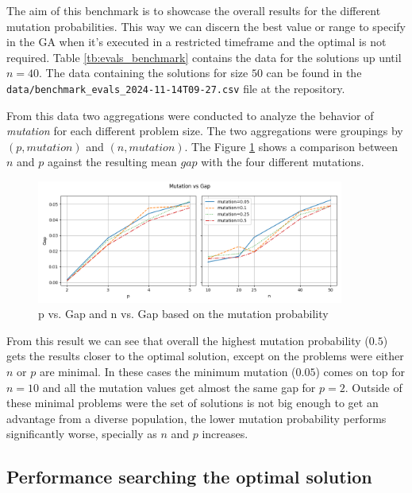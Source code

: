 \documentclass[onecolumn]{IEEEtran}
\def\code#1{\texttt{#1}}
\begin{document}
The aim of this benchmark is to showcase the overall results for the different mutation probabilities.
This way we can discern the best value or range to specify in the GA when it's executed in a restricted
timeframe and the optimal is not required.  Table \ref{tb:evals_benchmark}
contains the data for the solutions up until $n=40$. The data containing the solutions for size $50$
can be found in the \code{data/benchmark\_evals\_2024-11-14T09-27.csv} file at the repository\cite{SotoEstevezGA2024}.



From this data two aggregations were conducted to analyze the behavior of \emph{mutation} for each
different problem size. The two aggregations were groupings by $(p,mutation)$ and $(n,mutation)$.
The Figure \ref{fig:mutation_vs_gap}
shows a comparison between $n$ and $p$ against the resulting mean $gap$ with the four different mutations.

\begin{figure}[h!]
  \centering
  \includegraphics[width=0.9\textwidth]{figures/mutation_vs_gap.png}
  \caption{p vs. Gap and n vs. Gap based on the mutation probability}
  \label{fig:mutation_vs_gap}
\end{figure}

From this result we can see that overall the highest mutation probability ($0.5$) gets the results
closer to the optimal solution, except on the problems were either $n$ or $p$ are minimal. In these
cases the minimum mutation ($0.05$) comes on top for $n=10$ and all the mutation values get almost
the same gap for $p=2$. Outside of these minimal problems were the set of solutions is not big
enough to get an advantage from a diverse population, the lower mutation probability performs
significantly worse, specially as $n$ and $p$ increases.

\subsection{Performance searching the optimal solution\label{ss:benchmark_optimal}}
\end{document}
